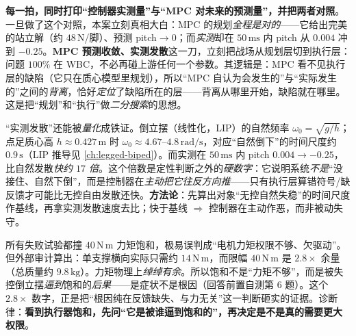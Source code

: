 \begin{insight}\label{ins:ld-plan-exec}
\textbf{每一拍，同时打印“控制器实测量”与“MPC 对未来的预测量”，并把两者对照}。一旦做了这个对照，本案立刻真相大白：MPC 的规划\emph{全程是对的}——它给出完美的站立解（约 $48\,\mathrm{N}$/脚）、预测 pitch$\to 0$；而\emph{实测}却在 $50\,\mathrm{ms}$ 内 pitch 从 $0.004$ 冲到 $-0.25$。\textbf{MPC 预测收敛、实测发散}这一刀，立刻把战场从规划层切到执行层：问题 $100\%$ 在 WBC，不必再碰上游任何一个参数。其逻辑是：MPC 看不见执行层的缺陷（它只在质心模型里规划），所以“MPC 自认为会发生的”与“实际发生的”之间的\emph{背离}，恰好\emph{定位}了缺陷所在的层——背离从哪里开始，缺陷就在哪里。这是把“规划”和“执行”做\emph{二分搜索}的思想。
\end{insight}

\begin{insight}\label{ins:ld-baseline-omega}
“实测发散”还能被\emph{量化}成铁证。倒立摆（线性化，LIP）的自然频率 $\omega_0=\sqrt{g/h}$；点足质心高 $h\approx 0.427\,\mathrm{m}$ 时 $\omega_0\approx 4.67\text{--}4.8\,\mathrm{rad/s}$，对应“自然倒下”的时间尺度约 $0.9\,\mathrm{s}$（LIP 推导见 \cref{ch:legged-biped}）。而实测在 $50\,\mathrm{ms}$ 内 pitch $0.004\to -0.25$，比自然发散\emph{快约 $17$ 倍}。这个倍数是定性判断之外的\emph{硬数字}：它说明系统\emph{不是}“没接住、自然下倒”，而是控制器在\emph{主动把它往反方向推}——只有执行层算错符号/缺反馈才可能比无控自由发散还快。\textbf{方法论}：先算出对象“无控自然失稳”的时间尺度作基线，再拿实测发散速度去比；快于基线 $\Rightarrow$ 控制器在主动作恶，而非被动失守。
\end{insight}

\begin{pitfall}\label{pit:ld-saturation}
所有失败试验都撞 $40\,\mathrm{N\,m}$ 力矩饱和，极易误判成“电机力矩权限不够、欠驱动”。但外部审计算出：单支撑横向实际只需约 $14\,\mathrm{N\,m}$，而限幅 $40\,\mathrm{N\,m}$ 是 $2.8\times$ 余量（总质量约 $9.8\,\mathrm{kg}$）。力矩物理上\emph{绰绰有余}。所以饱和不是“力矩不够”，而是被失控倒立摆\emph{逼到}饱和的\emph{后果}——是症状不是根因（回答前置自测第 6 题）。这个 $2.8\times$ 数字，正是把“根因纯在反馈缺失、与力无关”这一判断砸实的证据。诊断律：\textbf{看到执行器饱和，先问“它是被谁逼到饱和的”，再决定是不是真的需要更大权限}。
\end{pitfall}

